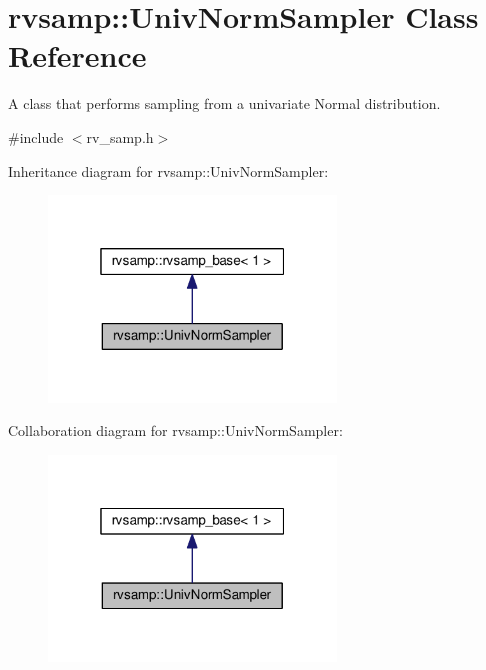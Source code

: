\hypertarget{classrvsamp_1_1UnivNormSampler}{}\section{rvsamp\+:\+:Univ\+Norm\+Sampler Class Reference}
\label{classrvsamp_1_1UnivNormSampler}


A class that performs sampling from a univariate Normal distribution.  




{\ttfamily \#include $<$rv\+\_\+samp.\+h$>$}



Inheritance diagram for rvsamp\+:\+:Univ\+Norm\+Sampler\+:\nopagebreak
\begin{figure}[H]
\begin{center}
\leavevmode
\includegraphics[width=217pt]{classrvsamp_1_1UnivNormSampler__inherit__graph}
\end{center}
\end{figure}


Collaboration diagram for rvsamp\+:\+:Univ\+Norm\+Sampler\+:\nopagebreak
\begin{figure}[H]
\begin{center}
\leavevmode
\includegraphics[width=217pt]{classrvsamp_1_1UnivNormSampler__coll__graph}
\end{center}
\end{figure}
